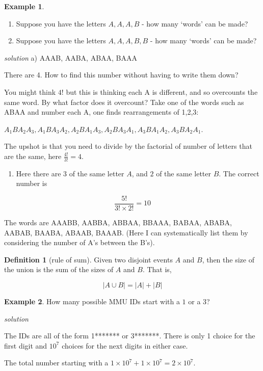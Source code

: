 \documentclass[
]{book}
\providecommand{\tightlist}{%
  \setlength{\itemsep}{0pt}\setlength{\parskip}{0pt}}
\theoremstyle{definition}
\newtheorem{definition}{Definition}[chapter]
\theoremstyle{definition}
\newtheorem{example}{Example}[chapter]
\theoremstyle{definition}
\theoremstyle{definition}
\theoremstyle{remark}
\begin{document}
\begin{example}
\leavevmode

\begin{enumerate}
\def\labelenumi{\alph{enumi})}
\item
  Suppose you have the letters \(A,A,A,B\) - how many `words' can be made?
\item
  Suppose you have the letters \(A,A,A,B,B\) - how many `words' can be made?
\end{enumerate}

\emph{solution}
a)
AAAB, AABA, ABAA, BAAA

There are 4. How to find this number without having to write them down?

You might think \(4!\) but this is thinking each A is different, and so overcounts the same word. By what factor does it overcount? Take one of the words such as ABAA and number each A, one finds rearrangements of 1,2,3:

\(A_1BA_2A_3, A_1BA_3A_2, A_2BA_1A_3, A_2BA_3A_1, A_3BA_1A_2, A_3BA_2A_1.\)

The upshot is that you need to divide by the factorial of number of letters that are the same, here \(\frac{4!}{3!} =4\).

\begin{enumerate}
\def\labelenumi{\alph{enumi})}
\setcounter{enumi}{1}
\tightlist
\item
  Here there are \(3\) of the same letter \(A\), and \(2\) of the same letter \(B\). The correct number is
\end{enumerate}

\[\frac{5!}{3!\times2!} = 10\]

The words are AAABB, AABBA, ABBAA, BBAAA, BABAA, ABABA, AABAB, BAABA, ABAAB, BAAAB. (Here I can systematically list them by considering the number of A's between the B's).

\end{example}

\begin{definition}[rule of sum]
Given two disjoint events \(A\) and \(B\), then the size of the union is the sum of the sizes of \(A\) and \(B\). That is,

\[|A\cup B|=|A|+|B|\]
\end{definition}

\begin{example}
How many possible MMU IDs start with a \(1\) or a \(3\)?

\emph{solution}

The IDs are all of the form 1******* or 3*******. There is only 1 choice for the first digit and \(10^7\) choices for the next digits in either case.

The total number starting with a \(1\times 10^7 + 1\times 10^7 = 2\times 10^7.\)
\end{example}
\end{document}
